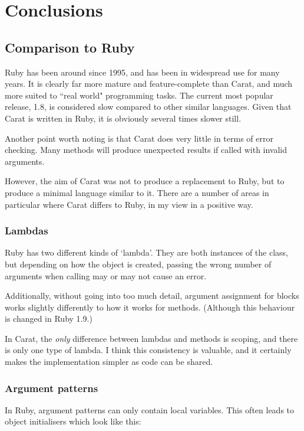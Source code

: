 \section{Conclusions}

\subsection{Comparison to Ruby}
\label{sec:ruby_comparison}

Ruby has been around since 1995, and has been in widespread use for many years. It is clearly far more mature and feature-complete than Carat, and much more suited to ``real world" programming tasks. The current most popular release, 1.8, is considered slow compared to other similar languages. Given that Carat is written in Ruby, it is obviously several times slower still.

Another point worth noting is that Carat does very little in terms of error checking. Many methods will produce unexpected results if called with invalid arguments.

However, the aim of Carat was not to produce a replacement to Ruby, but to produce a minimal language similar to it. There are a number of areas in particular where Carat differs to Ruby, in my view in a positive way.

\subsubsection{Lambdas}

Ruby has two different kinds of `lambda'. They are both instances of the  class, but depending on how the object is created, passing the wrong number of arguments when calling may or may not cause an error.

Additionally, without going into too much detail, argument assignment for blocks works slightly differently to how it works for methods. (Although this behaviour is changed in Ruby 1.9.)

In Carat, the \textit{only} difference between lambdas and methods is scoping, and there is only one type of lambda. I think this consistency is valuable, and it certainly makes the implementation simpler as code can be shared.

\subsubsection{Argument patterns}

In Ruby, argument patterns can only contain local variables. This often leads to object initialisers which look like this:


